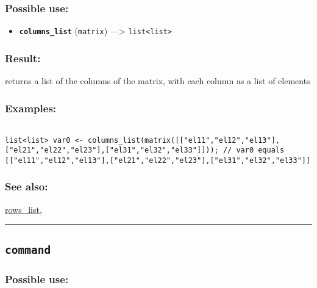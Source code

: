 \documentclass[]{book}
\providecommand{\tightlist}{%
  \setlength{\itemsep}{0pt}\setlength{\parskip}{0pt}}
\theoremstyle{definition}
\theoremstyle{definition}
\theoremstyle{definition}
\theoremstyle{remark}
\begin{document}
\subsubsection{Possible use:}\label{possible-use-92}

\begin{itemize}
\tightlist
\item
  \textbf{\texttt{columns\_list}} (\texttt{matrix}) ---\textgreater{}
  \texttt{list\textless{}list\textgreater{}}
\end{itemize}

\subsubsection{Result:}\label{result-90}

returns a list of the columns of the matrix, with each column as a list
of elements

\subsubsection{Examples:}\label{examples-71}

\begin{verbatim}
 
list<list> var0 <- columns_list(matrix([["el11","el12","el13"],["el21","el22","el23"],["el31","el32","el33"]])); // var0 equals [["el11","el12","el13"],["el21","el22","el23"],["el31","el32","el33"]]
\end{verbatim}

\subsubsection{See also:}\label{see-also-57}

\href{OperatorsNR\#rows_list}{rows\_list},

\begin{center}\rule{0.5\linewidth}{\linethickness}\end{center}

\subsection{\texorpdfstring{\texttt{command}}{command}}\label{command}

\subsubsection{Possible use:}\label{possible-use-93}
\end{document}
